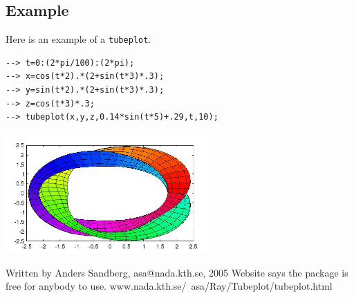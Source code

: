 \subsection{Example}

Here is an example of a \verb|tubeplot|.
\begin{verbatim}
--> t=0:(2*pi/100):(2*pi);
--> x=cos(t*2).*(2+sin(t*3)*.3);
--> y=sin(t*2).*(2+sin(t*3)*.3);
--> z=cos(t*3)*.3;
--> tubeplot(x,y,z,0.14*sin(t*5)+.29,t,10);
\end{verbatim}


\centerline{\includegraphics[width=8cm]{tubeplot1}}


 Written by Anders Sandberg, asa@nada.kth.se, 2005
 Website says the package is free for anybody to use.
 www.nada.kth.se/~asa/Ray/Tubeplot/tubeplot.html
